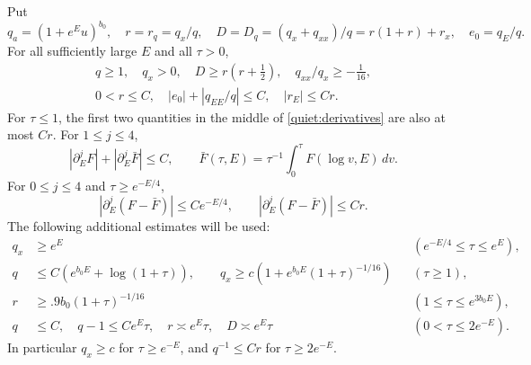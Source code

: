 \begin{lemma}\label{quiet:scalar}
Put
\[
 q_a=(1+e^Eu)^{b_0},\quad r=r_q=q_x/q,\quad
 D=D_q=(q_x+q_{xx})/q=r(1+r)+r_x,\quad e_0=q_E/q.
\]
For all sufficiently large \(E\) and all \(\tau>0\),
\begin{gather}
 q\ge1,\quad q_x>0,\quad
 D\ge r(r+\tfrac12),\quad q_{xx}/q_x\ge-\tfrac1{16},
 \label{quiet:slopes}\\
 0<r\le C,\quad |e_0|+|q_{EE}/q|\le C,
 \quad |r_E|\le Cr.
 \label{quiet:derivatives}
\end{gather}
For \(\tau\le1\), the first two quantities in the middle of
\eqref{quiet:derivatives} are also at most \(Cr\).
For \(1\le j\le4\),
\begin{equation}\label{quiet:Fderivatives}
 |\partial_E^jF|+|\partial_E^j\bar F|\le C,
 \qquad \bar F(\tau,E)=\tau^{-1}\int_0^\tau F(\log v,E)\,dv.
\end{equation}
For \(0\le j\le4\) and \(\tau\ge e^{-E/4}\),
\begin{equation}\label{quiet:difference}
 |\partial_E^j(F-\bar F)|\le C e^{-E/4},\qquad
 |\partial_E^j(F-\bar F)|\le Cr.
\end{equation}
The following additional estimates will be used:
\begin{align}
 q_x&\ge e^E &&(e^{-E/4}\le\tau\le e^E),
 \label{quiet:intermediate}\\
 q&\le C(e^{b_0E}+\log(1+\tau)),\qquad
 q_x\ge c(1+e^{b_0E}(1+\tau)^{-1/16}) &&(\tau\ge1),
 \label{quiet:tail}\\
 r&\ge .9 b_0(1+\tau)^{-1/16}
              &&(1\le\tau\le e^{3b_0E}),
 \label{quiet:middle-slope}\\
 q&\le C,\quad q-1\le Ce^E\tau,\quad
 r\asymp e^E\tau,\quad D\asymp e^E\tau
              &&(0<\tau\le2e^{-E}).
 \label{quiet:axis-slope}
\end{align}
In particular \(q_x\ge c\) for \(\tau\ge e^{-E}\), and
\(q^{-1}\le Cr\) for \(\tau\ge2e^{-E}\).
\end{lemma}

